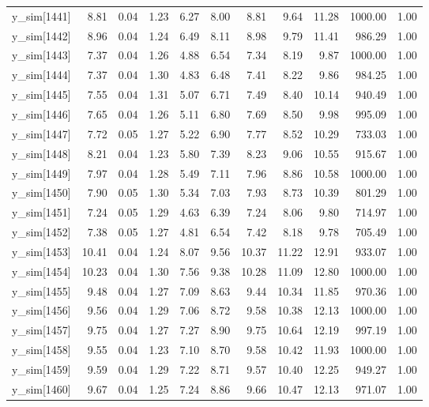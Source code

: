\begin{table}[ht]
\begin{tabular}{rrrrrrrrrrr}
  y\_sim[1441] & 8.81 & 0.04 & 1.23 & 6.27 & 8.00 & 8.81 & 9.64 & 11.28 & 1000.00 & 1.00 \\ 
  y\_sim[1442] & 8.96 & 0.04 & 1.24 & 6.49 & 8.11 & 8.98 & 9.79 & 11.41 & 986.29 & 1.00 \\ 
  y\_sim[1443] & 7.37 & 0.04 & 1.26 & 4.88 & 6.54 & 7.34 & 8.19 & 9.87 & 1000.00 & 1.00 \\ 
  y\_sim[1444] & 7.37 & 0.04 & 1.30 & 4.83 & 6.48 & 7.41 & 8.22 & 9.86 & 984.25 & 1.00 \\ 
  y\_sim[1445] & 7.55 & 0.04 & 1.31 & 5.07 & 6.71 & 7.49 & 8.40 & 10.14 & 940.49 & 1.00 \\ 
  y\_sim[1446] & 7.65 & 0.04 & 1.26 & 5.11 & 6.80 & 7.69 & 8.50 & 9.98 & 995.09 & 1.00 \\ 
  y\_sim[1447] & 7.72 & 0.05 & 1.27 & 5.22 & 6.90 & 7.77 & 8.52 & 10.29 & 733.03 & 1.00 \\ 
  y\_sim[1448] & 8.21 & 0.04 & 1.23 & 5.80 & 7.39 & 8.23 & 9.06 & 10.55 & 915.67 & 1.00 \\ 
  y\_sim[1449] & 7.97 & 0.04 & 1.28 & 5.49 & 7.11 & 7.96 & 8.86 & 10.58 & 1000.00 & 1.00 \\ 
  y\_sim[1450] & 7.90 & 0.05 & 1.30 & 5.34 & 7.03 & 7.93 & 8.73 & 10.39 & 801.29 & 1.00 \\ 
  y\_sim[1451] & 7.24 & 0.05 & 1.29 & 4.63 & 6.39 & 7.24 & 8.06 & 9.80 & 714.97 & 1.00 \\ 
  y\_sim[1452] & 7.38 & 0.05 & 1.27 & 4.81 & 6.54 & 7.42 & 8.18 & 9.78 & 705.49 & 1.00 \\ 
  y\_sim[1453] & 10.41 & 0.04 & 1.24 & 8.07 & 9.56 & 10.37 & 11.22 & 12.91 & 933.07 & 1.00 \\ 
  y\_sim[1454] & 10.23 & 0.04 & 1.30 & 7.56 & 9.38 & 10.28 & 11.09 & 12.80 & 1000.00 & 1.00 \\ 
  y\_sim[1455] & 9.48 & 0.04 & 1.27 & 7.09 & 8.63 & 9.44 & 10.34 & 11.85 & 970.36 & 1.00 \\ 
  y\_sim[1456] & 9.56 & 0.04 & 1.29 & 7.06 & 8.72 & 9.58 & 10.38 & 12.13 & 1000.00 & 1.00 \\ 
  y\_sim[1457] & 9.75 & 0.04 & 1.27 & 7.27 & 8.90 & 9.75 & 10.64 & 12.19 & 997.19 & 1.00 \\ 
  y\_sim[1458] & 9.55 & 0.04 & 1.23 & 7.10 & 8.70 & 9.58 & 10.42 & 11.93 & 1000.00 & 1.00 \\ 
  y\_sim[1459] & 9.59 & 0.04 & 1.29 & 7.22 & 8.71 & 9.57 & 10.40 & 12.25 & 949.27 & 1.00 \\ 
  y\_sim[1460] & 9.67 & 0.04 & 1.25 & 7.24 & 8.86 & 9.66 & 10.47 & 12.13 & 971.07 & 1.00 \\ 

\end{tabular}
\end{table}
